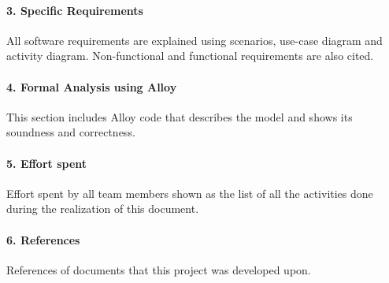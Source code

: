 \documentclass[../rasd.tex]{subfiles}
\begin{document}
		\paragraph{3. Specific Requirements}
		All software requirements are explained using scenarios, use-case diagram and activity diagram. Non-functional and functional requirements are also cited.
		\paragraph{4. Formal Analysis using Alloy}
		This section includes Alloy code that describes the model and shows its soundness and correctness.
		\paragraph{5. Effort spent}
		Effort spent by all team members shown as the list of all the activities done during the realization of this document.
		\paragraph{6. References}
		References of documents that this project was developed upon.

		
\end{document}
